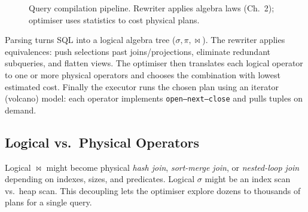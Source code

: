 \begin{figure}[h]
\centering
{}
\caption{Query compilation pipeline. Rewriter applies algebra laws (Ch.~2); optimiser uses statistics to cost physical plans.}
\label{fig:pipeline}
\end{figure}

Parsing turns SQL into a logical algebra tree ($\sigma,\pi,\bowtie$). The rewriter applies equivalences: push selections past joins/projections, eliminate redundant subqueries, and flatten views. The optimiser then translates each logical operator to one or more physical operators and chooses the combination with lowest estimated cost. Finally the executor runs the chosen plan using an iterator (volcano) model: each operator implements \texttt{open--next--close} and pulls tuples on demand.

\subsection{Logical vs.\ Physical Operators}

Logical $\bowtie$ might become physical \emph{hash join}, \emph{sort-merge join}, or \emph{nested-loop join} depending on indexes, sizes, and predicates. Logical $\sigma$ might be an index scan vs.\ heap scan. This decoupling lets the optimiser explore dozens to thousands of plans for a single query.

